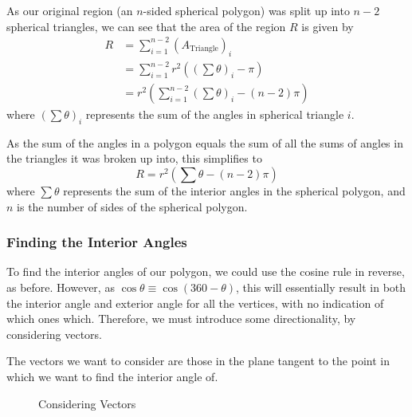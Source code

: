 \documentclass[12pt]{report}
\begin{document}
As our original region (an $n$-sided spherical polygon) was split up into $n-2$ spherical triangles, we can see that the area of the region $R$ is given by
\begin{equation}
\begin{split}
    R&=\displaystyle\sum_{i=1}^{n-2} {\left(A_{\text{Triangle}}\right)}_i\\
    &=\displaystyle\sum_{i=1}^{n-2} r^2\left({\left(\displaystyle\sum\theta\right)}_i-\pi\right)\\
    &=r^2\left(\displaystyle\sum_{i=1}^{n-2}{\left(\displaystyle\sum\theta\right)}_i-\left(n-2\right)\pi\right)
\end{split}
\end{equation}
where ${\left(\displaystyle\sum\theta\right)}_i$ represents the sum of the angles in spherical triangle $i$.

As the sum of the angles in a polygon equals the sum of all the sums of angles in the triangles it was broken up into, this simplifies to
\begin{equation}\label{eq:areaRegion}
    R=r^2\left(\displaystyle\sum\theta-\left(n-2\right)\pi\right)
\end{equation}
where $\displaystyle\sum\theta$ represents the sum of the interior angles in the spherical polygon, and $n$ is the number of sides of the spherical polygon.

\subsubsection{Finding the Interior Angles}
To find the interior angles of our polygon, we could use the cosine rule in reverse, as before. However, as $\cos\theta\equiv\cos\left(360-\theta\right)$, this will essentially result in both the interior angle and exterior angle for all the vertices, with no indication of which ones which. Therefore, we must introduce some directionality, by considering vectors.

The vectors we want to consider are those in the plane tangent to the point in which we want to find the interior angle of.
\begin{figure}[H]
\centering
{}
\caption{Considering Vectors}
\end{figure}
\end{document}
